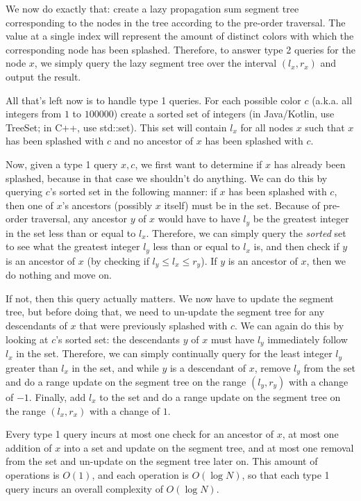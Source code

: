 \documentclass{article}
\begin{document}
We now do exactly that: create a lazy propagation sum segment tree corresponding to the nodes in the tree according to the pre-order traversal. The value at a single index will represent the amount of distinct colors with which the corresponding node has been splashed. Therefore, to answer type 2 queries for the node $x$, we simply query the lazy segment tree over the interval $(l_x, r_x)$ and output the result.

All that's left now is to handle type 1 queries. For each possible color $c$ (a.k.a. all integers from $1$ to $100000$) create a sorted set of integers (in Java/Kotlin, use TreeSet; in C++, use std::set). This set will contain $l_x$ for all nodes $x$ such that $x$ has been splashed with $c$ and no ancestor of $x$ has been splashed with $c$.

Now, given a type 1 query $x,c$, we first want to determine if $x$ has already been splashed, because in that case we shouldn't do anything. We can do this by querying $c$'s sorted set in the following manner: if $x$ has been splashed with $c$, then one of $x$'s ancestors (possibly $x$ itself) must be in the set. Because of pre-order traversal, any ancestor $y$ of $x$ would have to have $l_y$ be the greatest integer in the set less than or equal to $l_x$. Therefore, we can simply query the \textit{sorted} set to see what the greatest integer $l_y$ less than or equal to $l_x$ is, and then check if $y$ is an ancestor of $x$ (by checking if $l_y \leq l_x \leq r_y$). If $y$ is an ancestor of $x$, then we do nothing and move on.

If not, then this query actually matters. We now have to update the segment tree, but before doing that, we need to un-update the segment tree for any descendants of $x$ that were previously splashed with $c$. We can again do this by looking at $c$'s sorted set: the descendants $y$ of $x$ must have $l_y$ immediately follow $l_x$ in the set. Therefore, we can simply continually query for the least integer $l_y$ greater than $l_x$ in the set, and while $y$ is a descendant of $x$, remove $l_y$ from the set and do a range update on the segment tree on the range $(l_y, r_y)$ with a change of $-1$. Finally, add $l_x$ to the set and do a range update on the segment tree on the range $(l_x, r_x)$ with a change of $1$.

Every type 1 query incurs at most one check for an ancestor of $x$, at most one addition of $x$ into a set and update on the segment tree, and at most one removal from the set and un-update on the segment tree later on. This amount of operations is $O(1)$, and each operation is $O(\log N)$, so that each type 1 query incurs an overall complexity of $O(\log N)$.
\end{document}
